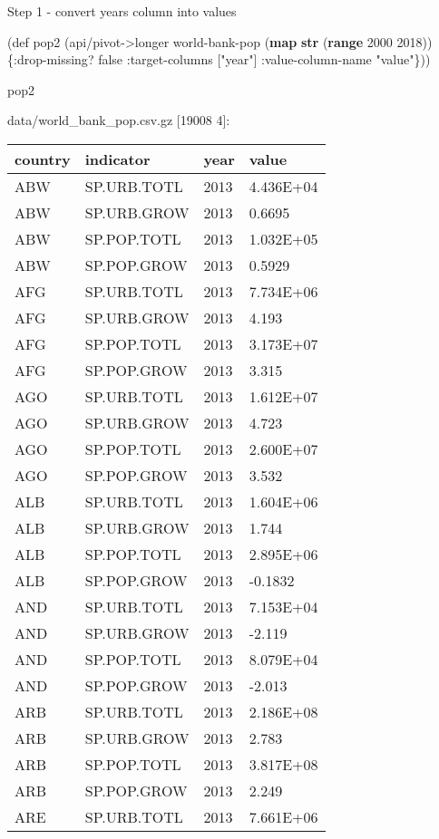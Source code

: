 \documentclass[]{article}
\newenvironment{Shaded}{\begin{snugshade}}{\end{snugshade}}
\newcommand{\KeywordTok}[1]{\textcolor[rgb]{0.13,0.29,0.53}{\textbf{#1}}}
\newcommand{\DecValTok}[1]{\textcolor[rgb]{0.00,0.00,0.81}{#1}}
\newcommand{\StringTok}[1]{\textcolor[rgb]{0.31,0.60,0.02}{#1}}
\newcommand{\FunctionTok}[1]{\textcolor[rgb]{0.00,0.00,0.00}{#1}}
\newcommand{\VariableTok}[1]{\textcolor[rgb]{0.00,0.00,0.00}{#1}}
\newcommand{\BuiltInTok}[1]{#1}
\newcommand{\AttributeTok}[1]{\textcolor[rgb]{0.77,0.63,0.00}{#1}}
\newcommand{\NormalTok}[1]{#1}
\begin{document}
Step 1 - convert years column into values

\begin{Shaded}
\begin{Highlighting}[]
\NormalTok{(}\BuiltInTok{def}\FunctionTok{ pop2 }\NormalTok{(api/pivot->longer world-bank-pop (}\KeywordTok{map} \KeywordTok{str}\NormalTok{ (}\KeywordTok{range} \DecValTok{2000} \DecValTok{2018}\NormalTok{)) \{}\AttributeTok{:drop-missing}\NormalTok{? }\VariableTok{false}
                                                                         \AttributeTok{:target-columns}\NormalTok{ [}\StringTok{"year"}\NormalTok{]}
                                                                         \AttributeTok{:value-column-name} \StringTok{"value"}\NormalTok{\}))}
\end{Highlighting}
\end{Shaded}

\begin{Shaded}
\begin{Highlighting}[]
\NormalTok{pop2}
\end{Highlighting}
\end{Shaded}

data/world\_bank\_pop.csv.gz {[}19008 4{]}:

\begin{longtable}[]{@{}llll@{}}
\toprule
country & indicator & year & value\tabularnewline
\midrule
\endhead
ABW & SP.URB.TOTL & 2013 & 4.436E+04\tabularnewline
ABW & SP.URB.GROW & 2013 & 0.6695\tabularnewline
ABW & SP.POP.TOTL & 2013 & 1.032E+05\tabularnewline
ABW & SP.POP.GROW & 2013 & 0.5929\tabularnewline
AFG & SP.URB.TOTL & 2013 & 7.734E+06\tabularnewline
AFG & SP.URB.GROW & 2013 & 4.193\tabularnewline
AFG & SP.POP.TOTL & 2013 & 3.173E+07\tabularnewline
AFG & SP.POP.GROW & 2013 & 3.315\tabularnewline
AGO & SP.URB.TOTL & 2013 & 1.612E+07\tabularnewline
AGO & SP.URB.GROW & 2013 & 4.723\tabularnewline
AGO & SP.POP.TOTL & 2013 & 2.600E+07\tabularnewline
AGO & SP.POP.GROW & 2013 & 3.532\tabularnewline
ALB & SP.URB.TOTL & 2013 & 1.604E+06\tabularnewline
ALB & SP.URB.GROW & 2013 & 1.744\tabularnewline
ALB & SP.POP.TOTL & 2013 & 2.895E+06\tabularnewline
ALB & SP.POP.GROW & 2013 & -0.1832\tabularnewline
AND & SP.URB.TOTL & 2013 & 7.153E+04\tabularnewline
AND & SP.URB.GROW & 2013 & -2.119\tabularnewline
AND & SP.POP.TOTL & 2013 & 8.079E+04\tabularnewline
AND & SP.POP.GROW & 2013 & -2.013\tabularnewline
ARB & SP.URB.TOTL & 2013 & 2.186E+08\tabularnewline
ARB & SP.URB.GROW & 2013 & 2.783\tabularnewline
ARB & SP.POP.TOTL & 2013 & 3.817E+08\tabularnewline
ARB & SP.POP.GROW & 2013 & 2.249\tabularnewline
ARE & SP.URB.TOTL & 2013 & 7.661E+06\tabularnewline
\bottomrule
\end{longtable}
\end{document}
